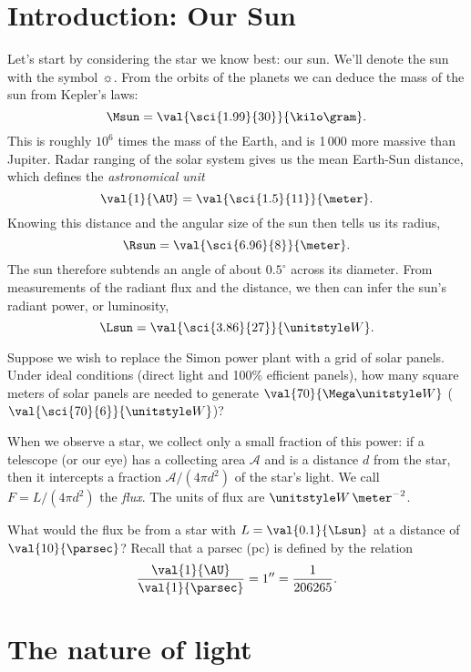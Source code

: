 
\section{Introduction: Our Sun}

Let's start by considering the star we know best: our sun.  We'll denote the sun with the symbol $\sun$.  From the orbits of the planets we can deduce the mass of the sun from Kepler's laws:
\[
	\Msun = \val{\sci{1.99}{30}}{\kilo\gram}.
\]
This is roughly $10^{6}$ times the mass of the Earth, and is 1\,000 more massive than Jupiter.
Radar ranging of the solar system gives us the mean Earth-Sun distance, which defines the \emph{astronomical unit}
\[
	\val{1}{\AU} = \val{\sci{1.5}{11}}{\meter}.
\]
Knowing this distance and the angular size of the sun then tells us its radius,
\[
	\Rsun = \val{\sci{6.96}{8}}{\meter}.
\]
The sun therefore subtends an angle of about $0.5^{\circ}$ across its diameter.
From measurements of the radiant flux and the distance, we then can infer the sun's radiant power, or luminosity,
\[
	\Lsun = \val{\sci{3.86}{27}}{\watt}.
\]

\begin{exercisebox}
Suppose we wish to replace the Simon power plant with a grid of solar panels. Under ideal conditions (direct light and 100\% efficient panels), how many square meters of solar panels are needed to generate $\val{70}{\Mega\watt}$ ($\val{\sci{70}{6}}{\watt}$)?
\end{exercisebox}

When we observe a star, we collect only a small fraction of this power: if a telescope (or our eye) has a collecting area $\mathcal{A}$ and is a distance $d$ from the star, then it intercepts a fraction $\mathcal{A}/(4\pi d^{2})$ of the star's light.  We call $F = L/(4\pi d^{2})$ the \emph{flux}. The units of flux are $\watt\,\meter^{-2}$.

\begin{exercisebox}
What would the flux be from a star with $L = \val{0.1}{\Lsun}$ at a distance of $\val{10}{\parsec}$?
Recall that a parsec (pc) is defined by the relation
\[
	\frac{\val{1}{\AU}}{\val{1}{\parsec}} = 1'' = \frac{1}{206265}.
\]
\end{exercisebox}

\section{The nature of light}\label{s.nature-light}

